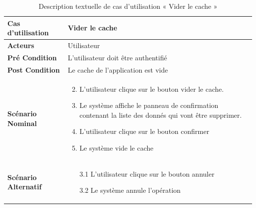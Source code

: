 
\begin{longtable}{|p{5cm}|p{10cm}|}
  \caption{Description textuelle de cas d'utilisation « Vider le cache  »} \label{tab:use_case_empty_cache} \\
\hline
\textbf{Cas d'utilisation}&Vider le cache  \\
\hline
\textbf{Acteurs}&Utilisateur\\
\hline
\textbf{Pré Condition}&L'utilisateur doit être authentifié\\
\hline
\textbf{Post Condition}&Le cache de l'application est vide \\
\hline
\textbf{Scénario Nominal}&
\vspace{-\baselineskip}
\begin{enumerate}
  \setcounter{enumi}{1}
  \item L'utilisateur clique sur le bouton vider le cache.
  \item Le système affiche le panneau de confirmation contenant la liste des donnés qui vont être supprimer.
  \item L'utilisateur clique sur le bouton confirmer
  \item Le système vide le cache
\end{enumerate}\\
\hline
\textbf{Scénario Alternatif}&
\vspace{-\baselineskip}
\begin{enumerate}
 \item [3.1] L'utilisateur clique sur le bouton annuler
 \item [3.2] Le système annule l'opération
\end{enumerate}\\
\hline

\end{longtable}




